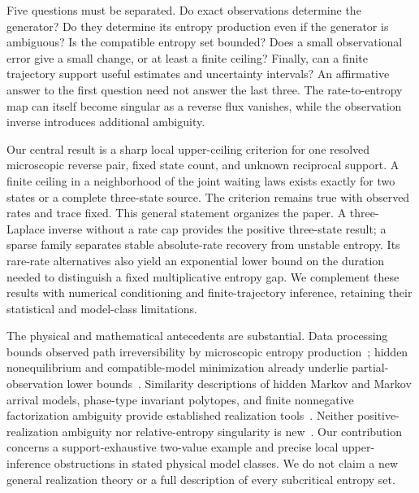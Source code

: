\documentclass[aps,pre,onecolumn,11pt,longbibliography,notitlepage]{revtex4-2}
\newcommand{\1}{\mathbf 1}
\begin{document}
Five questions must be separated. Do exact observations determine the generator? Do they determine its entropy production even if the generator is ambiguous? Is the compatible entropy set bounded? Does a small observational error give a small change, or at least a finite ceiling? Finally, can a finite trajectory support useful estimates and uncertainty intervals? An affirmative answer to the first question need not answer the last three. The rate-to-entropy map can itself become singular as a reverse flux vanishes, while the observation inverse introduces additional ambiguity.

Our central result is a sharp local upper-ceiling criterion for one resolved microscopic reverse pair, fixed state count, and unknown reciprocal support. A finite ceiling in a neighborhood of the joint waiting laws exists exactly for two states or a complete three-state source. The criterion remains true with observed rates and trace fixed. This general statement organizes the paper. A three-Laplace inverse without a rate cap provides the positive three-state result; a sparse family separates stable absolute-rate recovery from unstable entropy. Its rare-rate alternatives also yield an exponential lower bound on the duration needed to distinguish a fixed multiplicative entropy gap. We complement these results with numerical conditioning and finite-trajectory inference, retaining their statistical and model-class limitations.

The physical and mathematical antecedents are substantial. Data processing bounds observed path irreversibility by microscopic entropy production~\cite{vanDerMeer2022,Harunari2022}; hidden nonequilibrium and compatible-model minimization already underlie partial-observation lower bounds~\cite{WagnerTimmer2000,Ehrich2021,Nitzan2023}. Similarity descriptions of hidden Markov and Markov arrival models, phase-type invariant polytopes, and finite nonnegative factorization ambiguity provide established realization tools~\cite{Vanluyten2008,HorvathTelek2007,HeZhang2006,Mond2003}. Neither positive-realization ambiguity nor relative-entropy singularity is new~\cite{Zeraati2012,SasonVerdu2016}. Our contribution concerns a support-exhaustive two-value example and precise local upper-inference obstructions in stated physical model classes. We do not claim a new general realization theory or a full description of every subcritical entropy set.
\end{document}
